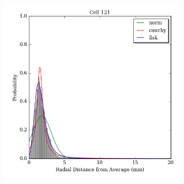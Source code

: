 \documentclass[12pt]{article}
\begin{document}
\begin{figure}
\begin{subfigure}{.5\textwidth}
  \includegraphics[width=\linewidth]{../figures/cellfigs/probdens121.png}
  \label{fig:sub2}
\end{subfigure}
\label{fig:test}


\end{figure}
\end{document}

